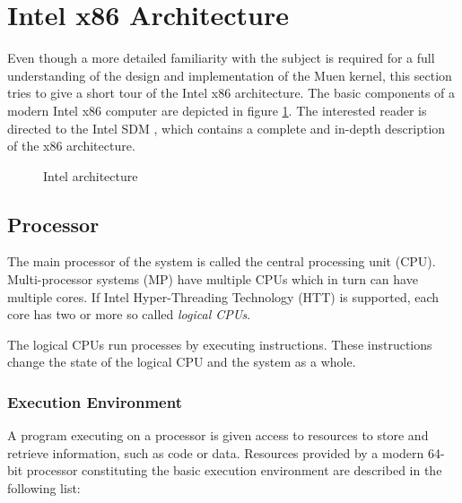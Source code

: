 \section{Intel x86 Architecture}
Even though a more detailed familiarity with the subject is required for a full
understanding of the design and implementation of the Muen kernel, this section
tries to give a short tour of the Intel x86 architecture. The basic components
of a modern Intel x86 computer are depicted in figure
\ref{fig:intel-architecture}. The interested reader is directed to the Intel SDM
\cite{IntelSDM}, which contains a complete and in-depth description of the x86
architecture.

\begin{figure}[h]
	\centering
	
	\caption{Intel architecture}
	\label{fig:intel-architecture}
\end{figure}

\subsection{Processor}
The main processor of the system is called the central processing unit
(CPU). Multi-processor systems (MP) have multiple CPUs
which in turn can have multiple cores. If Intel Hyper-Threading Technology (HTT)
is supported, each core has two or more so called \emph{logical CPUs}.

The logical CPUs run processes by executing instructions. These instructions
change the state of the logical CPU and the system as a whole.

\subsubsection{Execution Environment}\label{subsubsec:exec-env}
A program executing on a processor is given access to resources to store and
retrieve information, such as code or data. Resources provided by a modern
64-bit processor constituting the basic execution environment are described in
the following list:

